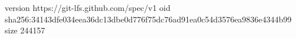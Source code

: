 version https://git-lfs.github.com/spec/v1
oid sha256:34143dfe034eea36dc13dbe0d776f75dc76ad91ea0c54d3576ea9836e4344b99
size 244157
